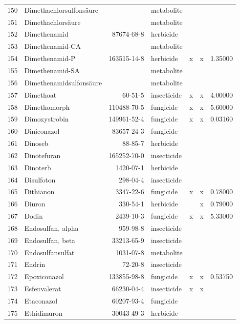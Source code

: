 \begin{longtable}{lp{4cm}rlp{1.3cm}p{1.3cm}p{1.5cm}}
  150 & Dimethachlorsulfonsäure &  & metabolite &  &  &  \\ 
  151 & Dimethachlorsäure &  & metabolite &  &  &  \\ 
  152 & Dimethenamid & 87674-68-8 & herbicide &  &  &  \\ 
  153 & Dimethenamid-CA &  & metabolite &  &  &  \\ 
  154 & Dimethenamid-P & 163515-14-8 & herbicide & x & x & 1.35000 \\ 
  155 & Dimethenamid-SA &  & metabolite &  &  &  \\ 
  156 & Dimethenamidsulfonsäure &  & metabolite &  &  &  \\ 
  157 & Dimethoat & 60-51-5 & insecticide & x & x & 4.00000 \\ 
  158 & Dimethomorph & 110488-70-5 & fungicide & x & x & 5.60000 \\ 
  159 & Dimoxystrobin & 149961-52-4 & fungicide & x & x & 0.03160 \\ 
  160 & Diniconazol & 83657-24-3 & fungicide &  &  &  \\ 
  161 & Dinoseb & 88-85-7 & herbicide &  &  &  \\ 
  162 & Dinotefuran & 165252-70-0 & insecticide &  &  &  \\ 
  163 & Dinoterb & 1420-07-1 & herbicide &  &  &  \\ 
  164 & Disulfoton & 298-04-4 & insecticide &  &  &  \\ 
  165 & Dithianon & 3347-22-6 & fungicide & x & x & 0.78000 \\ 
  166 & Diuron & 330-54-1 & herbicide &  & x & 0.79000 \\ 
  167 & Dodin & 2439-10-3 & fungicide & x & x & 5.33000 \\ 
  168 & Endosulfan, alpha & 959-98-8 & insecticide &  &  &  \\ 
  169 & Endosulfan, beta & 33213-65-9 & insecticide &  &  &  \\ 
  170 & Endosulfansulfat & 1031-07-8 & metabolite &  &  &  \\ 
  171 & Endrin & 72-20-8 & insecticide &  &  &  \\ 
  172 & Epoxiconazol & 133855-98-8 & fungicide & x & x & 0.53750 \\ 
  173 & Esfenvalerat & 66230-04-4 & insecticide & x & x &  \\ 
  174 & Etaconazol & 60207-93-4 & fungicide &  &  &  \\ 
  175 & Ethidimuron & 30043-49-3 & herbicide &  &  &  \\ 

\end{longtable}
